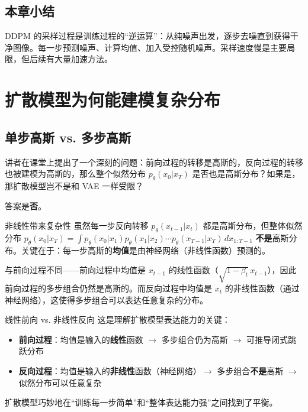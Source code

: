 \documentclass[a4paper]{article}
\begin{document}
\subsection{本章小结}

DDPM 的采样过程是训练过程的``逆运算''：从纯噪声出发，逐步去噪直到获得干净图像。每一步预测噪声、计算均值、加入受控随机噪声。采样速度慢是主要局限，但后续有大量加速方法。


\section{扩散模型为何能建模复杂分布}

\subsection{单步高斯 vs. 多步高斯}

讲者在课堂上提出了一个深刻的问题：前向过程的转移是高斯的，反向过程的转移也被建模为高斯的，那么整个似然分布 $p_\theta(x_0|x_T)$ 是否也是高斯分布？如果是，那扩散模型岂不是和 VAE 一样受限？

答案是\textbf{否}。

\begin{importantbox}{非线性带来复杂性}
虽然每一步反向转移 $p_\theta(x_{t-1}|x_t)$ 都是高斯分布，但整体似然分布 $p_\theta(x_0|x_T) = \int p_\theta(x_0|x_1) p_\theta(x_1|x_2) \cdots p_\theta(x_{T-1}|x_T) \, dx_{1:T-1}$ \textbf{不是}高斯分布。关键在于：每一步高斯的\textbf{均值}是由神经网络（非线性函数）预测的。

与前向过程不同——前向过程中均值是 $x_{t-1}$ 的线性函数（$\sqrt{1-\beta_t}\, x_{t-1}$），因此前向过程的多步组合仍然是高斯的。而反向过程中均值是 $x_t$ 的非线性函数（通过神经网络），这使得多步组合可以表达任意复杂的分布。
\end{importantbox}

\begin{warningbox}{线性前向 vs. 非线性反向}
这是理解扩散模型表达能力的关键：
\begin{itemize}
    \item \textbf{前向过程}：均值是输入的\textbf{线性}函数 $\rightarrow$ 多步组合仍为高斯 $\rightarrow$ 可推导闭式跳跃分布
    \item \textbf{反向过程}：均值是输入的\textbf{非线性}函数（神经网络）$\rightarrow$ 多步组合\textbf{不是}高斯 $\rightarrow$ 似然分布可以任意复杂
\end{itemize}
扩散模型巧妙地在``训练每一步简单''和``整体表达能力强''之间找到了平衡。
\end{warningbox}
\end{document}

